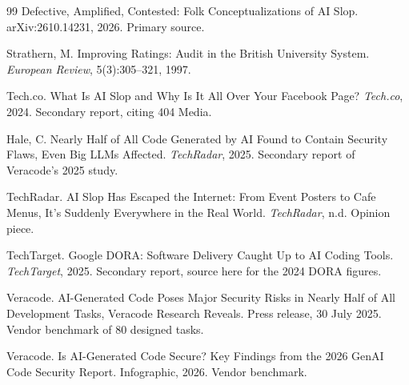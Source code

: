 \documentclass[11pt,a4paper]{article}
\theoremstyle{remark}
\begin{document}
\begin{thebibliography}{99}
Defective, Amplified, Contested: Folk Conceptualizations of AI Slop. arXiv:2610.14231, 2026. Primary source.

Strathern, M. Improving Ratings: Audit in the British University System. \emph{European Review}, 5(3):305--321, 1997.

Tech.co. What Is AI Slop and Why Is It All Over Your Facebook Page? \emph{Tech.co}, 2024. Secondary report, citing 404 Media.

Hale, C. Nearly Half of All Code Generated by AI Found to Contain Security Flaws, Even Big LLMs Affected. \emph{TechRadar}, 2025. Secondary report of Veracode's 2025 study.

TechRadar. AI Slop Has Escaped the Internet: From Event Posters to Cafe Menus, It's Suddenly Everywhere in the Real World. \emph{TechRadar}, n.d. Opinion piece.

TechTarget. Google DORA: Software Delivery Caught Up to AI Coding Tools. \emph{TechTarget}, 2025. Secondary report, source here for the 2024 DORA figures.

Veracode. AI-Generated Code Poses Major Security Risks in Nearly Half of All Development Tasks, Veracode Research Reveals. Press release, 30 July 2025. Vendor benchmark of 80 designed tasks.

Veracode. Is AI-Generated Code Secure? Key Findings from the 2026 GenAI Code Security Report. Infographic, 2026. Vendor benchmark.

\end{thebibliography}
\end{document}
